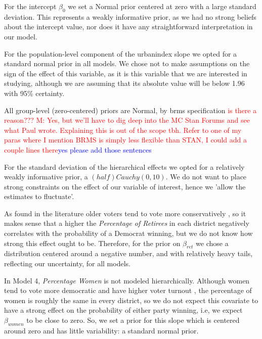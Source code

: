 \documentclass[12pt]{article}
\newcommand{\blue}[1]{\textcolor{blue}{#1}}
\begin{document}

For the intercept $\beta_0$ we set a Normal prior centered at zero with a large standard deviation. 
This represents a weakly informative prior, as we had no strong beliefs about the intercept value, nor does it have any straightforward interpretation in our model.


For the population-level component of the urbanindex slope we opted for a standard normal prior in all models. We chose not to make assumptions on the sign of the effect of this variable, as it is this variable that we are interested in studying, although we are assuming that its absolute value will be below 1.96 with 95\% certainty. 

All group-level (zero-centered) priors are Normal, by brms specification \textcolor{red}{is there a reason??? M: Yes, but we'll have to dig deep into the MC Stan Forums and see what Paul wrote. Explaining this is out of the scope tbh. Refer to one of my paras where I mention BRMS is simply less flexible than STAN, I could add a couple lines there}\blue{yes please add those sentences}

For the standard deviation of the hierarchical effects we opted for a relatively weakly informative prior, a $(half)Cauchy(0,10)$.
We do not want to place strong constraints on the effect of our variable of interest, hence we 'allow the estimates to fluctuate'.



As found in the literature older voters tend to vote more conservatively \parencite{brown2022oldvoters}, so it makes sense that a higher the \textit{Percentage of Retirees} in each district negatively correlates with the probability of a Democrat winning, but we do not know how strong this effect ought to be. Therefore, for the prior on $\beta_{ret}$ we chose a distribution centered around a negative number, and with relatively heavy tails, reflecting our uncertainty, for all models. 



In Model 4, \textit{Percentage Women} is not modeled hierarchically.
Although women tend to vote more democratic and have higher voter turnout \parencite{pew2020}, the percentage of women is roughly the same in every district, so we do not expect this covariate to have a strong effect on the probability of either party winning, i.e, we expect $\beta_{women}$ to be close to zero. So, we set a prior for this slope which is centered around zero and has little variability: a standard normal prior. 
\end{document}

